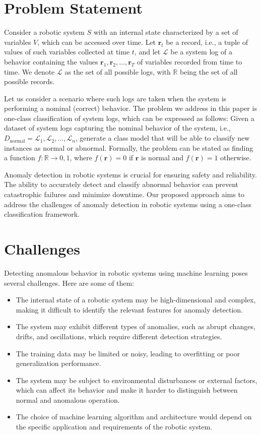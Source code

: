 \documentclass[12]{article}
\begin{document}
\section{Problem Statement}

Consider a robotic system $S$ with an internal state characterized by a set of variables $V$, which can be accessed over time. Let $\boldsymbol{r}_t$ be a record, i.e., a tuple of values of such variables collected at time $t$, and let $\mathcal{L}$ be a system log of a behavior containing the values $\boldsymbol{r}_1, \boldsymbol{r}_2, \dots, \boldsymbol{r}_T$ of variables recorded from time to time. We denote $\mathcal{L}$ as the set of all possible logs, with $\mathbb{R}$ being the set of all possible records.

Let us consider a scenario where such logs are taken when the system is performing a nominal (correct) behavior. The problem we address in this paper is one-class classification of system logs, which can be expressed as follows: Given a dataset of system logs capturing the nominal behavior of the system, i.e., $D_{\text{normal}} = {\mathcal{L}_1, \mathcal{L}_2, \dots, \mathcal{L}_n}$, generate a class model that will be able to classify new instances as normal or abnormal. Formally, the problem can be stated as finding a function $f: \mathbb{R} \rightarrow {0, 1}$, where $f(\boldsymbol{r})=0$ if $\boldsymbol{r}$ is normal and $f(\boldsymbol{r})=1$ otherwise.

Anomaly detection in robotic systems is crucial for ensuring safety and reliability. The ability to accurately detect and classify abnormal behavior can prevent catastrophic failures and minimize downtime. Our proposed approach aims to address the challenges of anomaly detection in robotic systems using a one-class classification framework.


\section{Challenges}

Detecting anomalous behavior in robotic systems using machine learning poses several challenges. Here are some of them:
\begin{itemize}
\item The internal state of a robotic system may be high-dimensional and complex, making it difficult to identify the relevant features for anomaly detection.
\item The system may exhibit different types of anomalies, such as abrupt changes, drifts, and oscillations, which require different detection strategies.
\item The training data may be limited or noisy, leading to overfitting or poor generalization performance.
\item The system may be subject to environmental disturbances or external factors, which can affect its behavior and make it harder to distinguish between normal and anomalous operation.
\item The choice of machine learning algorithm and architecture would depend on the specific application and requirements of the robotic system.
\end{itemize}
\end{document}
